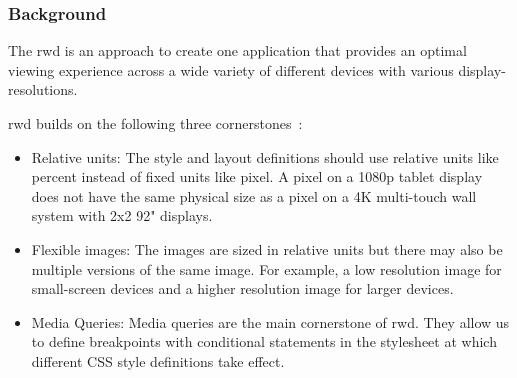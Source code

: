 \documentclass{sigchi}
\begin{document}
\subsubsection{Background}
The \gls{rwd} \cite{Marcotte:2011} is an approach to create one application that provides an optimal viewing experience across a wide variety of different devices with various display-resolutions. 

\gls{rwd} builds on the following three cornerstones~\cite{Marcotte:2011}:
\begin{itemize}
	\item Relative units: The style and layout definitions should use relative units like percent instead of fixed units like pixel. 
	A pixel on a 1080p tablet display does not have the same physical size as a pixel on a 4K multi-touch wall system with 2x2 92" displays. 
	
	\item Flexible images: The images are sized in relative units but there may also be multiple versions of the same image. 
	For example, a low resolution image for small-screen devices and a higher resolution image for larger devices.
	
	\item Media Queries: Media queries are the main cornerstone of \gls{rwd}. 
	They allow us to define breakpoints with conditional statements in the stylesheet at which different CSS style definitions take effect.
\end{itemize}
\end{document}

